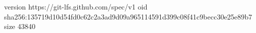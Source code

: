 version https://git-lfs.github.com/spec/v1
oid sha256:135719d10d54fd0c62c2a3ad9d09a965114591d399c08f41c9becc30e25e89b7
size 43840
